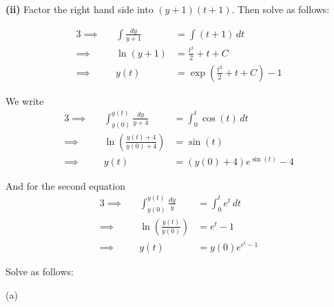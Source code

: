 \documentclass[a4paper]{article}
\begin{document}
\textbf{(ii)} Factor the right hand side into \(\!\left( y + 1 \right) \!\left( t + 1 \right) \). Then solve as follows:

\begin{alignat*}{3}
	\implies &&\int \frac{dy}{y + 1} & = \int \!\left( t + 1 \right) \, dt \\
	\implies && \ln\left( y + 1 \right) & = \frac{t^{2}}{2} + t + C  \\ 
	\implies && y \!\left( t \right) & = \exp\left( \frac{t^{2}}{2} + t + C \right) - 1 
\end{alignat*}


We write
\begin{alignat*}{3}
	\implies && \int^{y \!\left( t \right) }_{y \!\left( 0 \right) } \frac{dy}{y + 4} & = \int^{t}_{0} \cos\left( t \right) \, dt  \\
	\implies && \ln\left( \frac{y \!\left( t \right) + 4}{y \!\left( 0 \right) + 4} \right)& = \sin\left( t \right) \\ 
	\implies && y \!\left( t \right) & = \!\left( y \!\left( 0 \right) + 4 \right) e^{\sin\left( t \right)} - 4
\end{alignat*}

And for the second equation
\begin{alignat*}{3}
	\implies && \int^{y \!\left( t \right) }_{y \!\left( 0 \right) } \frac{dy}{y}  & = \int^{t}_{0} e^{t} \, dt  \\
	\implies && \ln\left( \frac{y \!\left( t \right) }{y \!\left( 0 \right) } \right) & = e^{t} - 1 \\
	\implies && y \!\left( t \right) & = y \!\left( 0 \right) e^{e^{t} - 1}
\end{alignat*}


Solve as follows:

(a) 
\end{document}
